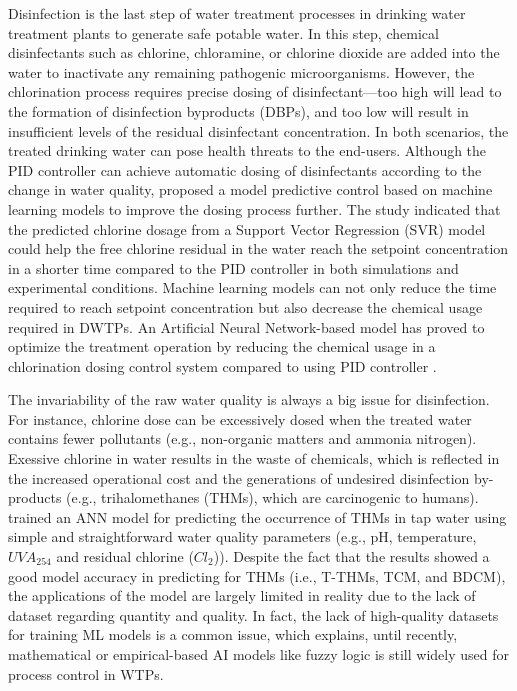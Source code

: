Disinfection is the last step of water treatment processes in drinking water treatment plants to generate safe potable water. In this step, chemical disinfectants such as chlorine, chloramine, or chlorine dioxide are added into the water to inactivate any remaining pathogenic microorganisms. However, the chlorination process requires precise dosing of disinfectant---too high will lead to the formation of disinfection byproducts (DBPs), and too low will result in insufficient levels of the residual disinfectant concentration. In both scenarios, the treated drinking water can pose health threats to the end-users. Although the PID controller can achieve automatic dosing of disinfectants according to the change in water quality, \citet{wangModelPredictiveControl2020} proposed a model predictive control based on machine learning models to improve the dosing process further. The study indicated that the predicted chlorine dosage from a Support Vector Regression (SVR) model could help the free chlorine residual in the water reach the setpoint concentration in a shorter time compared to the PID controller in both simulations and experimental conditions. Machine learning models can not only reduce the time required to reach setpoint concentration but also decrease the chemical usage required in DWTPs. An Artificial Neural Network-based model has proved to optimize the treatment operation by reducing the chemical usage in a chlorination dosing control system compared to using PID controller \citep{librantzArtificialNeuralNetworks2018}.

The invariability of the raw water quality is always a big issue for disinfection. For instance, chlorine dose can be excessively dosed when the treated water contains fewer pollutants (e.g., non-organic matters and ammonia nitrogen). Exessive chlorine in water results in the waste of chemicals, which is reflected in the increased operational cost and the generations of undesired disinfection by-products (e.g., trihalomethanes (THMs), which are carcinogenic to humans). \citet{xuUsingSimpleEasy2022} trained an ANN model for predicting the occurrence of THMs in tap water using simple and straightforward water quality parameters (e.g., pH, temperature, $UVA_{254}$ and residual chlorine ($Cl_{2}$)). Despite the fact that the results showed a good model accuracy in predicting for THMs (i.e., T-THMs, TCM, and BDCM), the applications of the model are largely limited in reality due to the lack of dataset regarding quantity and quality. In fact, the lack of high-quality datasets for training ML models is a common issue, which explains, until recently, mathematical or empirical-based AI models like fuzzy logic \citep{gamizFuzzyGainScheduling2020,godo-plaControlPrimaryDisinfection2021} is still widely used for process control in WTPs.

